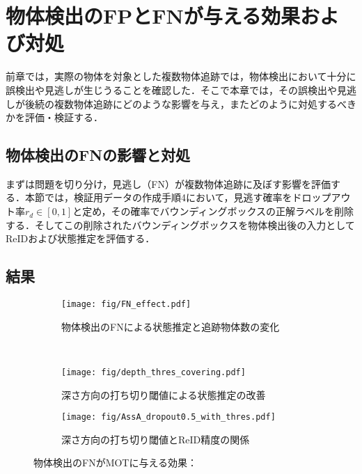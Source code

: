 \section{物体検出のFPとFNが与える効果および対処}
\label{sec:covering_detection}

    前章では，実際の物体を対象とした複数物体追跡では，物体検出において十分に誤検出や見逃しが生じうることを確認した．そこで本章では，その誤検出や見逃しが後続の複数物体追跡にどのような影響を与え，またどのように対処するべきかを評価・検証する．

    \subsection{物体検出のFNの影響と対処}
    \label{subsec:false_negative_effect}

    まずは問題を切り分け，見逃し（FN）が複数物体追跡に及ぼす影響を評価する．本節では，検証用データの作成手順4において，見逃す確率をドロップアウト率$r_{d} \in [0, 1]$と定め，その確率でバウンディングボックスの正解ラベルを削除する．そしてこの削除されたバウンディングボックスを物体検出後の入力としてReIDおよび状態推定を評価する．

    \subsection{結果}

    \begin{figure}[t]
        \centering
        \begin{subfigure}[b]{\linewidth}
            \centering
            \texttt{[image: fig/FN\_effect.pdf]}
            \caption[物体検出のFNによる状態推定と追跡物体数の変化]{物体検出のFNによる状態推定と追跡物体数の変化}
            \label{fig:FN_effect}
        \end{subfigure}
        \\
        \begin{subfigure}[t]{0.6\linewidth}
            \centering
            \texttt{[image: fig/depth\_thres\_covering.pdf]}
            \caption[深さ方向の打ち切り閾値による状態推定の改善]{深さ方向の打ち切り閾値による状態推定の改善}
            \label{fig:depth_thres_covering}
        \end{subfigure}
        \hfill
        \begin{subfigure}[t]{0.3\linewidth}
            \centering
            \texttt{[image: fig/AssA\_dropout0.5\_with\_thres.pdf]}
            \caption[深さ方向の打ち切り閾値とReID精度の関係]{深さ方向の打ち切り閾値とReID精度の関係}
            \label{fig:AssA_with_thres}
        \end{subfigure}
        \caption[物体検出のFNがMOTに与える効果]{物体検出のFNがMOTに与える効果：}
        \label{fig:MOT_detectionFN}
    \end{figure}

